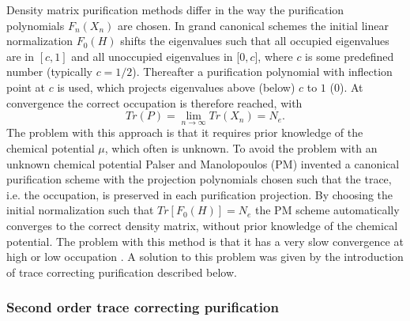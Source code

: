 \documentclass[twocolumn,showpacs,preprintnumbers,amsmath,amssymb]{revtex4}
\begin{document}
Density matrix purification methods differ in the way the purification polynomials $F_n(X_n)$
are chosen. In grand canonical schemes \cite{Palser98,Holas01,NiklassonTC2} the initial linear normalization
$F_0(H)$ shifts the  eigenvalues such that all occupied eigenvalues are in $[c,1]$ and
all unoccupied eigenvalues in [$0,c]$, where $c$ is some predefined number (typically $c = 1/2$).
Thereafter a purification polynomial with inflection point at $c$ is used, which projects
eigenvalues above (below) $c$ to $1$ ($0$). At convergence the correct occupation is therefore reached, with
\begin{equation}
Tr(P) = \lim_{n \rightarrow \infty} Tr(X_n) = N_e.
\end{equation}
The problem with this approach is that it requires prior knowledge of the 
chemical potential $\mu$, which often is unknown. 
To avoid the problem with an unknown chemical potential Palser and Manolopoulos (PM) invented a
canonical purification scheme \cite{Palser98} with the projection polynomials chosen
such that the trace, i.e. the occupation, is preserved in each purification projection.
By choosing the initial normalization such that $Tr[F_0(H)] = N_e$ the PM scheme
automatically converges to the correct density matrix, without prior knowledge of 
the chemical potential.  The problem with this method is that it has a very slow
convergence at high or low occupation \cite{Palser98,NiklassonTC2}.
A solution to this problem was given by the introduction of trace correcting purification \cite{NiklassonTC2}
described below.

\subsubsection{Second order trace correcting purification}
\end{document}
